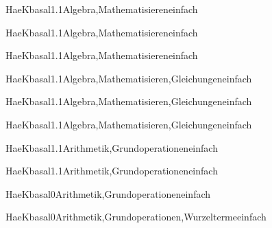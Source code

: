 \documentclass[12pt]{article}
\begin{document}
\begin{Add}{HaeK}{basal1.1}{Algebra,Mathematisieren}{einfach}
\end{Add}

\begin{Add}{HaeK}{basal1.1}{Algebra,Mathematisieren}{einfach}
\end{Add}

\begin{Add}{HaeK}{basal1.1}{Algebra,Mathematisieren}{einfach}
\end{Add}

\begin{Add}{HaeK}{basal1.1}{Algebra,Mathematisieren,Gleichungen}{einfach}
\end{Add}

\begin{Add}{HaeK}{basal1.1}{Algebra,Mathematisieren,Gleichungen}{einfach}
\end{Add}

\begin{Add}{HaeK}{basal1.1}{Algebra,Mathematisieren,Gleichungen}{einfach}
\end{Add}

\begin{Add}{HaeK}{basal1.1}{Arithmetik,Grundoperationen}{einfach}
\end{Add}

\begin{Add}{HaeK}{basal1.1}{Arithmetik,Grundoperationen}{einfach}
\end{Add}

\begin{Add}{HaeK}{basal0}{Arithmetik,Grundoperationen}{einfach}
\end{Add}

\begin{Add}{HaeK}{basal0}{Arithmetik,Grundoperationen,Wurzelterme}{einfach}
\end{Add}
\end{document}

